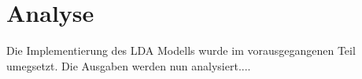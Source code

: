 \documentclass[german,version-2020-11]{uzl-thesis}
\begin{document}










	
\chapter{Analyse}%
Die Implementierung des LDA Modells wurde im vorausgegangenen Teil umegsetzt. Die Ausgaben werden nun analysiert....
\end{document}
